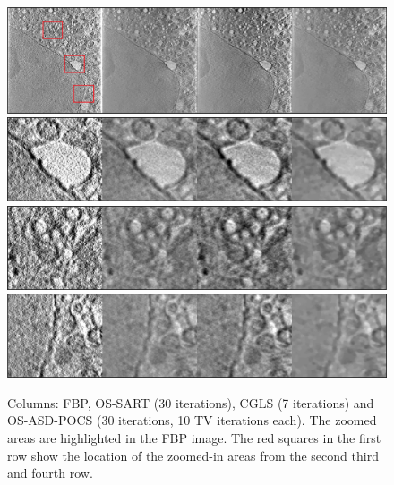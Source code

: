 \begin{figure}
\begin{center}

\includegraphics[width=\textwidth]{Applications/Diamond5.png} 
\includegraphics[width=\textwidth]{Applications/Diamond5zoom1.png} 
\includegraphics[width=\textwidth]{Applications/Diamond5zoom2.png} 
\includegraphics[width=\textwidth]{Applications/Diamond5zoom3.png} 

\end{center}

\caption[Cell image recosntructed with different algorithms 3]{\label{fig:Diamond3} Columns: FBP, OS-SART (30 iterations), CGLS (7 iterations) and OS-ASD-POCS (30 iterations, 10 TV iterations each). The zoomed areas are highlighted in the FBP image. The red squares in the first row show the location of the zoomed-in areas from the second third and fourth row.} 
\end{figure}


